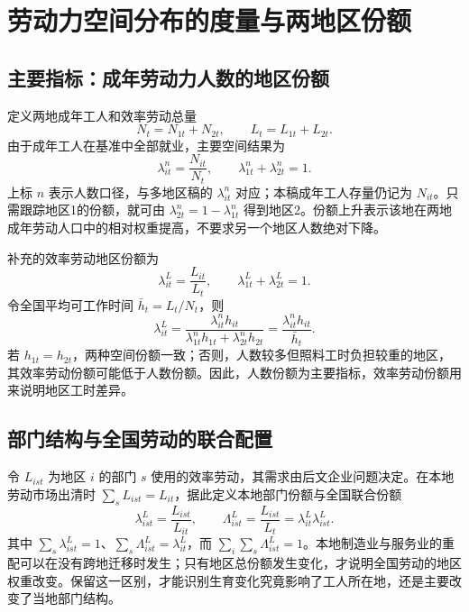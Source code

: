 \documentclass[UTF8,a4paper,zihao=-4,fontset=windows]{ctexart}
\numberwithin{equation}{section}
\begin{document}
\section{劳动力空间分布的度量与两地区份额}
\label{sec:spatial-distribution}

\subsection{主要指标：成年劳动力人数的地区份额}
定义两地成年工人和效率劳动总量
\begin{equation}
 N_t=N_{1t}+N_{2t},\qquad L_t=L_{1t}+L_{2t}.
\end{equation}
由于成年工人在基准中全部就业，主要空间结果为
\begin{equation}
 \lambda^n_{it}=\frac{N_{it}}{N_t},\qquad
 \lambda^n_{1t}+\lambda^n_{2t}=1.
 \label{eq:headcount-spatial-share}
\end{equation}
上标 $n$ 表示人数口径，与多地区稿的 $\lambda^n_{it}$ 对应；本稿成年工人存量仍记为 $N_{it}$。只需跟踪地区1的份额，就可由 $\lambda^n_{2t}=1-\lambda^n_{1t}$ 得到地区2。份额上升表示该地在两地成年劳动人口中的相对权重提高，不要求另一个地区人数绝对下降。

补充的效率劳动地区份额为
\begin{equation}
 \lambda^L_{it}=\frac{L_{it}}{L_t},\qquad
 \lambda^L_{1t}+\lambda^L_{2t}=1.
 \label{eq:effective-spatial-share}
\end{equation}
令全国平均可工作时间 $\bar h_t=L_t/N_t$，则
\begin{equation}
 \lambda^L_{it}=\frac{\lambda^n_{it}h_{it}}
 {\lambda^n_{1t}h_{1t}+\lambda^n_{2t}h_{2t}}
 =\frac{\lambda^n_{it}h_{it}}{\bar h_t}.
 \label{eq:headcount-effective-share-link}
\end{equation}
若 $h_{1t}=h_{2t}$，两种空间份额一致；否则，人数较多但照料工时负担较重的地区，其效率劳动份额可能低于人数份额。因此，人数份额为主要指标，效率劳动份额用来说明地区工时差异。

\subsection{部门结构与全国劳动的联合配置}
令 $L_{ist}$ 为地区 $i$ 的部门 $s$ 使用的效率劳动，其需求由后文企业问题决定。在本地劳动市场出清时 $\sum_sL_{ist}=L_{it}$，据此定义本地部门份额与全国联合份额
\begin{equation}
 \lambda^L_{ist}=\frac{L_{ist}}{L_{it}},\qquad
 \Lambda^L_{ist}=\frac{L_{ist}}{L_t}
 =\lambda^L_{it}\lambda^L_{ist}.
 \label{eq:joint-spatial-sector-share}
\end{equation}
其中 $\sum_s\lambda^L_{ist}=1$、$\sum_s\Lambda^L_{ist}=\lambda^L_{it}$，而 $\sum_i\sum_s\Lambda^L_{ist}=1$。本地制造业与服务业的重配可以在没有跨地迁移时发生；只有地区总份额发生变化，才说明全国劳动的地区权重改变。保留这一区别，才能识别生育变化究竟影响了工人所在地，还是主要改变了当地部门结构。
\end{document}
